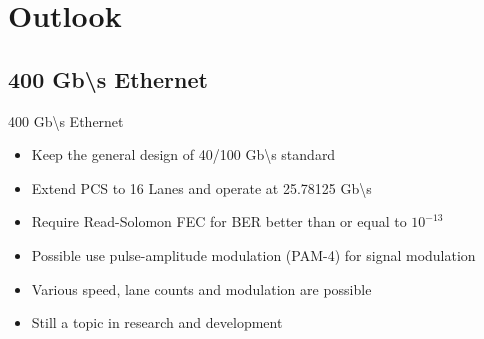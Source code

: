 \documentclass[fleqn,11pt,aspectratio=169]{beamer}
\begin{document}
\section{Outlook}
\subsection{400 Gb\textbackslash s Ethernet}
\begin{frame}{400 Gb\textbackslash s Ethernet}
\begin{itemize}
  \item Keep the general design of 40/100 Gb\textbackslash s standard
  \item Extend PCS to 16 Lanes and operate at 25.78125 Gb\textbackslash s
  \item Require Read-Solomon FEC for BER better than or equal to $10^{-13}$
  \item Possible use pulse-amplitude modulation (PAM-4) for signal modulation
  \item Various speed, lane counts and modulation are possible
  \item Still a topic in research and development
\end{itemize}
\end{frame}
\end{document}
